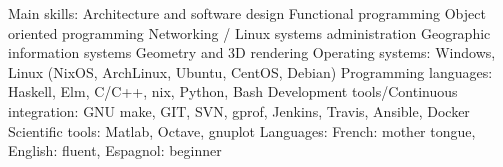 \begin{cvskills}
  \cvskill
    {Main skills:}
 	{
		Architecture and software design\newline
        Functional programming\newline
        Object oriented programming\newline
        Networking / Linux systems administration\newline
        Geographic information systems\lastnewline
        Geometry and 3D rendering
	}
  \cvskill
    {Operating systems:}
 	{Windows, Linux (NixOS, ArchLinux, Ubuntu, CentOS, Debian)}
  \cvskill
    {Programming languages:}
 	{Haskell, Elm, C/C++, nix, Python, Bash}
  \cvskill
	{Development tools/Continuous integration:}
	{GNU make, GIT, SVN, gprof, Jenkins, Travis, Ansible, Docker}
  \cvskill
	{Scientific tools:}
	{Matlab, Octave, gnuplot}
  \cvskill
    {Languages:}
 	{
        French: mother tongue,
		English: fluent,
		Espagnol: beginner
	}
\end{cvskills}

